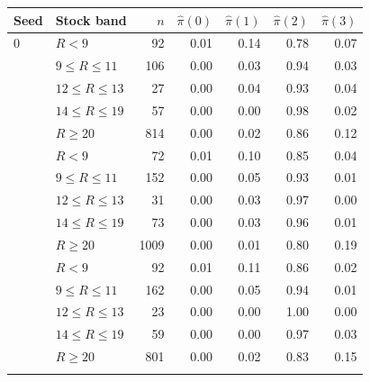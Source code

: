 \begin{tabular}{llrrrrr}
\toprule
Seed & Stock band & $n$ & $\hat\pi(0)$ & $\hat\pi(1)$ & $\hat\pi(2)$ & $\hat\pi(3)$ \\
\midrule
0 & $R<9$ & 92 & 0.01 & 0.14 & 0.78 & 0.07 \\
 & $9\le R\le 11$ & 106 & 0.00 & 0.03 & 0.94 & 0.03 \\
 & $12\le R\le 13$ & 27 & 0.00 & 0.04 & 0.93 & 0.04 \\
 & $14\le R\le 19$ & 57 & 0.00 & 0.00 & 0.98 & 0.02 \\
 & $R\ge 20$ & 814 & 0.00 & 0.02 & 0.86 & 0.12 \\
\addlinespace
1 & $R<9$ & 72 & 0.01 & 0.10 & 0.85 & 0.04 \\
 & $9\le R\le 11$ & 152 & 0.00 & 0.05 & 0.93 & 0.01 \\
 & $12\le R\le 13$ & 31 & 0.00 & 0.03 & 0.97 & 0.00 \\
 & $14\le R\le 19$ & 73 & 0.00 & 0.03 & 0.96 & 0.01 \\
 & $R\ge 20$ & 1009 & 0.00 & 0.01 & 0.80 & 0.19 \\
\addlinespace
2 & $R<9$ & 92 & 0.01 & 0.11 & 0.86 & 0.02 \\
 & $9\le R\le 11$ & 162 & 0.00 & 0.05 & 0.94 & 0.01 \\
 & $12\le R\le 13$ & 23 & 0.00 & 0.00 & 1.00 & 0.00 \\
 & $14\le R\le 19$ & 59 & 0.00 & 0.00 & 0.97 & 0.03 \\
 & $R\ge 20$ & 801 & 0.00 & 0.02 & 0.83 & 0.15 \\
\addlinespace
\bottomrule
\end{tabular}

